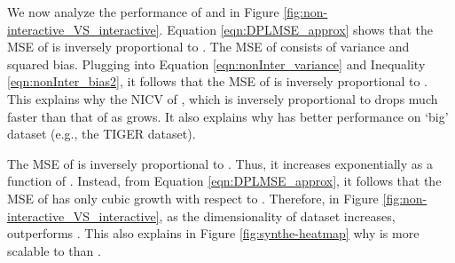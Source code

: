 \begin{comment}
\mypara{Comparing \ugkm with \mkm.} The difference of the two non-interactive methods is the choice of . The \ugkm method sets it to , and the \mkm method sets it to . Figure \ref{fig:non-interactive_VS_interactive} shows that the performance of \ugkm is superior to that of \mkm. The following gives two possible reasons.

First, \mkm does not take  as a factor in . Thus, it is nonadaptive to the variation of . Plugging the  values into Equation \ref{eqn:nonInter_variance}, we know that the variance of \ugkm is inversely proportional to , while that of \mkm is inversely proportional to . This explains why \ugkm performs much better than \mkm for small  values (Figure \ref{fig:non-interactive_VS_interactive}), and it also explains why the NICV of \mkm drops faster than that of \ugkm.

Second, as the dimensionality increases, the number of cells generated by \mkm is far much more than the dataset size. When the dimensionality is big enough, \mkm generates approximately  cells. Thus, most cells are empty. After adding Laplace noise, they turn into random noises, and result in poor performance of k-means clustering. \todo{This explains why the \ugkm is superior to \mkm on the 6D Adult dataset.}
\end{comment}

 We now analyze the performance of \dpl and \eugkm in Figure \ref{fig:non-interactive_VS_interactive}. Equation \ref{eqn:DPLMSE_approx} shows that the MSE of \dpl is inversely proportional to . The MSE of \eugkm consists of variance and squared bias. Plugging  into Equation \ref{eqn:nonInter_variance} and Inequality \ref{eqn:nonInter_bias2},
it follows that the MSE of \eugkm is inversely proportional to . This explains why the NICV of \dpl, which is inversely proportional to  drops much faster than that of \eugkm as  grows. It also explains why \dpl has better performance on `big' dataset (e.g., the TIGER dataset).


The MSE of \eugkm is inversely proportional to . Thus, it increases exponentially as a function of . Instead, from Equation \ref{eqn:DPLMSE_approx}, it follows that the MSE of \dpl has only cubic growth with respect to . Therefore, in Figure \ref{fig:non-interactive_VS_interactive}, as the dimensionality of dataset increases, \dpl outperforms \eugkm. This also explains in Figure \ref{fig:synthe-heatmap}  why \dpl is more scalable to  than \eugkm.


